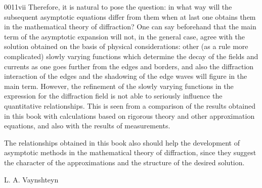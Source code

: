 \begin{scanpage}{0011}{vii}
Therefore, it is natural to pose the question: in what way will the subsequent asymptotic equations differ from them when at last one obtains them in the mathematical theory of diffraction? One can say beforehand that the main term of the asymptotic expansion will not, in the general case, agree with the solution obtained on the basis of physical considerations: other (as a rule more complicated) slowly varying functions which determine the decay of the fields and currents as one goes further from the edges and borders, and also the diffraction interaction of the edges and the shadowing of the edge waves will figure in the main term. However, the refinement of the slowly varying functions in the expression for the diffraction field is not able to seriously influence the quantitative relationships. This is seen from a comparison of the results obtained in this book with calculations based on rigorous theory and other approximation equations, and also with the results of measurements.

The relationships obtained in this book also should help the development of asymptotic methods in the mathematical theory of diffraction, since they suggest the character of the approximations and the structure of the desired solution.
\vspace{1cm}\begin{flushright}L. A. Vaynshteyn\end{flushright}
\end{scanpage}
